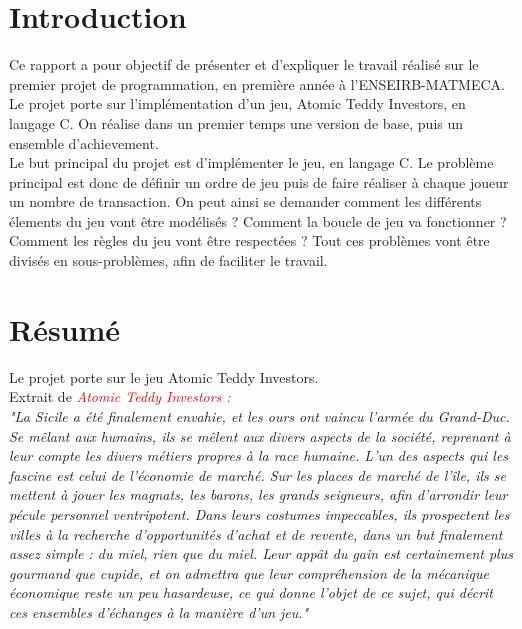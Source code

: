 \documentclass{article}
\begin{document}
\newpage


\section{Introduction}
Ce rapport a pour objectif de pr\'esenter et d'expliquer le travail r\'ealis\'e sur le premier projet de programmation, en premi\`ere ann\'ee \`a l'ENSEIRB-MATMECA.
Le projet porte sur l'impl\'ementation d'un jeu, Atomic Teddy Investors, en langage C. On r\'ealise dans un premier temps une version de base, puis un ensemble d'achievement.\\

Le but principal du projet est d'impl\'ementer le jeu, en langage C. Le probl\`eme principal est donc de d\'efinir un ordre de jeu puis de faire r\'ealiser \`a chaque joueur un nombre de transaction. On peut ainsi se demander comment les diff\'erents \'elements du jeu  vont \^etre mod\'elis\'es ?
Comment la boucle de jeu va fonctionner ? Comment les r\`egles du jeu vont \^etre respect\'ees ?
Tout ces probl\`emes vont \^etre divis\'es en sous-probl\`emes, afin de faciliter le travail. 

\section{R\'esum\'e}
Le projet porte sur le jeu Atomic Teddy Investors.\\

Extrait de \textcolor{red}{\textit{Atomic Teddy Investors :}}\\ 
\textit{"La Sicile a \'et\'e finalement envahie, et les ours ont vaincu l'arm\'ee du Grand-Duc. Se m\^elant aux humains, ils se m\^elent aux divers aspects de la soci\'et\'e, 
reprenant \`a leur compte les divers m\'etiers propres \`a la race humaine. L'un des aspects qui les fascine est celui de l'\'economie de march\'e. Sur les places de 
march\'e de l'\^ile, ils se mettent \`a jouer les magnats, les barons, les grands seigneurs, afin d'arrondir leur p\'ecule personnel ventripotent. Dans leurs costumes 
impeccables, ils prospectent les villes \`a la recherche d'opportunit\'es d'achat et de revente, dans un but finalement assez simple : du miel, rien que du miel. 
Leur app\^at du gain est certainement plus gourmand que cupide, et on admettra que leur compr\'ehension de la m\'ecanique \'economique reste un peu hasardeuse, ce qui 
donne l'objet de ce sujet, qui d\'ecrit ces ensembles d'\'echanges \`a la mani\`ere d'un jeu."}\\
\end{document}
